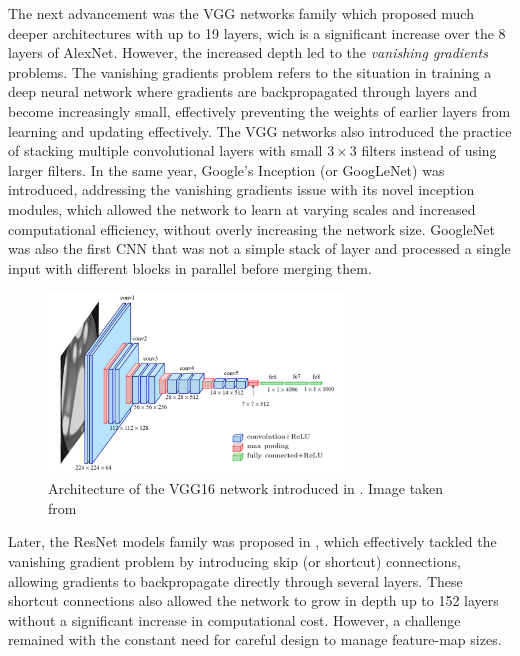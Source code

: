 The next advancement was the VGG networks family
\cite{DBLP:journals/corr/SimonyanZ14a} %
which proposed much deeper architectures with up to 19 layers, wich is a
significant increase over the 8 layers of AlexNet. However, the increased depth
led to the \emph{vanishing gradients} problems. The vanishing gradients problem
refers to the situation in training a deep neural network where gradients are
backpropagated through layers and become increasingly small, effectively
preventing the weights of earlier layers from learning and updating effectively.
The VGG networks also introduced the practice of stacking multiple convolutional
layers with small $3\times 3$ filters instead of using larger filters. In the
same year, Google's Inception (or GoogLeNet)
\cite{DBLP:conf/cvpr/SzegedyLJSRAEVR15} was introduced, addressing the vanishing
gradients  issue with its novel inception modules, which allowed the network to
learn at varying scales and increased computational efficiency, without overly
increasing the network size. GoogleNet was also the first \ac{CNN} that was not
a simple stack of layer and processed a single input with different blocks in
parallel before merging them.\\

\begin{figure}[htbp]
  \centering
  \includegraphics[width=0.7\textwidth]{chapter_sota/assets/vgg16.png}
  \caption{Architecture of the VGG16 network introduced in
    \cite{DBLP:journals/corr/SimonyanZ14a}. Image taken from
    \cite{ferguson2017automatic}}
  \label{fig:dlo:vgg16}
\end{figure}

Later, the ResNet models family was proposed in \cite{DBLP:conf/cvpr/HeZRS16},
which effectively tackled the vanishing gradient problem by introducing skip (or
shortcut) connections, allowing gradients to backpropagate directly through
several layers. These shortcut connections also allowed the network to grow in
depth up to 152 layers without a significant increase in computational cost.
However, a challenge remained with the constant need for careful design to
manage feature-map sizes.\\

